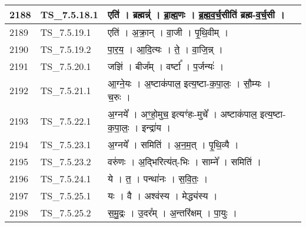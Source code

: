 \documentclass[17pt]{extarticle}
\begin{document}
\begin{longtable}{||p{0.4in}||p{0.9in}||p{4.0in}||p{0.9in}||}
        \hline
            2188 & TS\_7.5.18.1 & एति॑   ।   ब्रह्मन्न्॑   ।   ब्रा॒ह्म॒णः   ।   ब्र॒ह्म॒व॒र्च॒सीति॑ ब्रह्म{-}व॒र्च॒सी   ।    &      \\
        \hline
            2189 & TS\_7.5.19.1 & एति॑   ।   अ॒क्रा॒न्   ।   वा॒जी   ।   पृ॒थि॒वीम्   ।    &      \\
        \hline
            2190 & TS\_7.5.19.2 & पा॒र॒य॒   ।   आ॒दि॒त्यः   ।   ते॒   ।   वा॒जि॒न्न्   ।    &      \\
        \hline
            2191 & TS\_7.5.20.1 & जज्ञि॑   ।   बीज᳚म्   ।   वर्ष्टा᳚   ।   प॒र्जन्यः॑   ।    &      \\
        \hline
            2192 & TS\_7.5.21.1 & आ॒ग्ने॒यः   ।   अ॒ष्टाक॑पाल॒ इत्य॒ष्टा{-}क॒पा॒लः॒   ।   सौ॒म्यः   ।   च॒रुः   ।    &      \\
        \hline
            2193 & TS\_7.5.22.1 & अ॒ग्नये᳚   ।   अꣳ॒॒हो॒मुच॒ इत्यꣳ॑हः{-}मुचे᳚   ।   अष्टाक॑पाल॒ इत्य॒ष्टा{-}क॒पा॒लः॒   ।   इन्द्रा॑य   ।    &      \\
        \hline
            2194 & TS\_7.5.23.1 & अ॒ग्नये᳚   ।   समिति॑   ।   अ॒न॒म॒त्   ।   पृ॒थि॒व्यै   ।    &      \\
        \hline
            2195 & TS\_7.5.23.2 & वरु॑णः   ।   अ॒द्भिरित्य॑त्{-}भिः   ।   साम्ने᳚   ।   समिति॑   ।    &      \\
        \hline
            2196 & TS\_7.5.24.1 & ये   ।   त॒   ।   पन्था॑नः   ।   स॒वि॒तः॒   ।    &      \\
        \hline
            2197 & TS\_7.5.25.1 & यः   ।   वै   ।   अश्व॑स्य   ।   मेद्ध्य॑स्य   ।    &      \\
        \hline
            2198 & TS\_7.5.25.2 & स॒मु॒द्रः   ।   उ॒दर᳚म्   ।   अ॒न्तरि॑क्षम्   ।   पा॒युः   ।    &      \\
        \hline
        \bottomrule
  \end{longtable}
  
\end{document}
